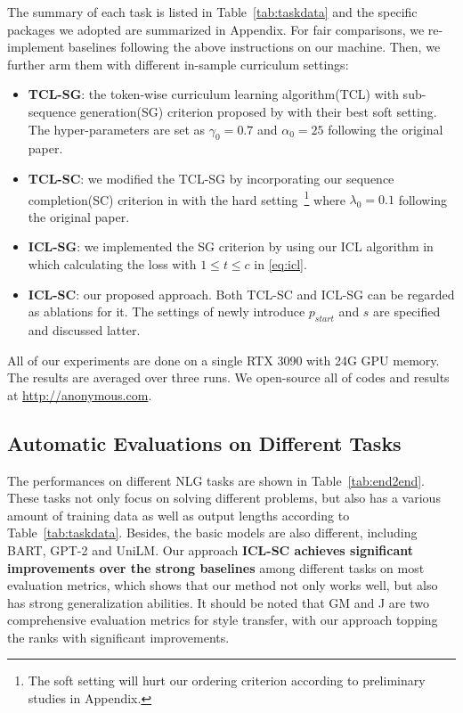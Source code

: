 The summary of each task is listed in Table~\ref{tab:taskdata} and the specific packages we adopted are summarized in Appendix. 
For fair comparisons, we re-implement baselines following the above instructions on our machine. Then, we further arm them with different in-sample curriculum settings:
\begin{itemize}
	\item \textbf{TCL-SG}: the token-wise curriculum learning algorithm(TCL) with sub-sequence generation(SG) criterion proposed by \citet{liang-etal-2021-token-wise} with their best soft setting. The hyper-parameters are set as $\gamma_0=0.7$ and $\alpha_0=25$ following the original paper.
	\item \textbf{TCL-SC}: we modified the TCL-SG by incorporating our sequence completion(SC) criterion in  with the hard setting~\footnote{The soft setting will hurt our ordering criterion according to preliminary studies in Appendix.} where $\lambda_0=0.1$ following the original paper.
	\item \textbf{ICL-SG}: we implemented the SG criterion by using our ICL algorithm in  which calculating the loss with $1\leq t \leq c$ in \eqref{eq:icl}.
	\item \textbf{ICL-SC}: our proposed approach. Both TCL-SC and ICL-SG can be regarded as ablations for it. The settings of newly introduce $p_{start}$ and $s$ are specified and discussed latter.
\end{itemize}
All of our experiments are done on a single RTX 3090 with 24G GPU memory. The results are averaged over three runs. We open-source all of codes and results at \url{http://anonymous.com}.


 
\subsection{Automatic Evaluations on Different Tasks}
\label{sec:taskperformances}

The performances on different NLG tasks are shown in Table~\ref{tab:end2end}. 
These tasks not only focus on solving different problems, but also has a various amount of training data as well
as output lengths according to
Table~\ref{tab:taskdata}.
Besides, the basic models are also different, including BART, GPT-2 and UniLM. 
Our approach \textbf{ICL-SC achieves significant improvements over the strong baselines} among different tasks on most evaluation metrics, which shows that our method not only works well, but also has strong generalization abilities.
It should be noted that GM and J are two comprehensive evaluation metrics for style transfer, with our approach topping the ranks with significant improvements.


